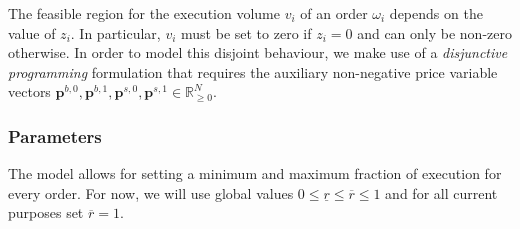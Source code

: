 \documentclass[11pt,parskip=full]{scrartcl}%
\begin{document}
The feasible region for the execution volume $ v_i $ of an order $ \omega_i $ depends on the value
of $ z_i $.
In particular, $ v_i $ must be set to zero if $ z_i = 0 $ and can only be non-zero otherwise.
In order to model this disjoint behaviour, we make use of a \emph{disjunctive programming}
formulation that requires the auxiliary non-negative price variable vectors
$ \mathbf{p}^{b,0}, \mathbf{p}^{b,1}, \mathbf{p}^{s,0}, \mathbf{p}^{s,1} \in \mathbb{R}^N_{\ge 0}
$.

\subsubsection*{Parameters}

The model allows for setting a minimum and maximum fraction of execution for every order.
For now, we will use global values $ 0 \le \underline{r} \le \overline{r} \le 1 $ and for all
current purposes set $ \overline{r} = 1 $.
\end{document}
